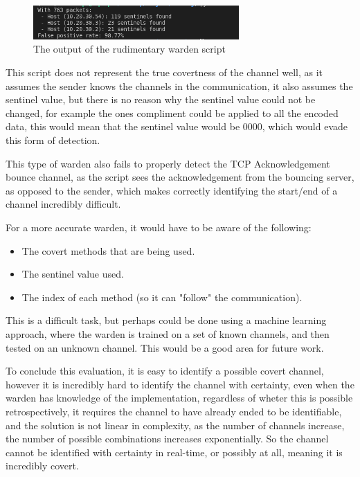 \begin{figure}[H]
    \centering
    \includegraphics[width=0.7\textwidth]{fig/rudimentary_warden.png}
    \caption{The output of the rudimentary warden script}
    \label{fig:warden_output}
\end{figure}

This script does not represent the true covertness of the channel well, as it assumes the sender knows the channels in the communication, it also assumes the sentinel value, but there is no reason why the sentinel value could not be changed, for example the ones compliment could be applied to all the encoded data, this would mean that the sentinel value would be 0000, which would evade this form of detection.

This type of warden also fails to properly detect the TCP Acknowledgement bounce channel, as the script sees the acknowledgement from the bouncing server, as opposed to the sender, which makes correctly identifying the start/end of a channel incredibly difficult.

For a more accurate warden, it would have to be aware of the following:

\begin{itemize}
    \item The covert methods that are being used.
    \item The sentinel value used.
    \item The index of each method (so it can "follow" the communication).
\end{itemize}

This is a difficult task, but perhaps could be done using a machine learning approach, where the warden is trained on a set of known channels, and then tested on an unknown channel. This would be a good area for future work.

To conclude this evaluation, it is easy to identify a possible covert channel, however it is incredibly hard to identify the channel with certainty, even when the warden has knowledge of the implementation, regardless of wheter this is possible retrospectively, it requires the channel to have already ended to be identifiable, and the solution is not linear in complexity, as the number of channels increase, the number of possible combinations increases exponentially. So the channel cannot be identified with certainty in real-time, or possibly at all, meaning it is incredibly covert.

